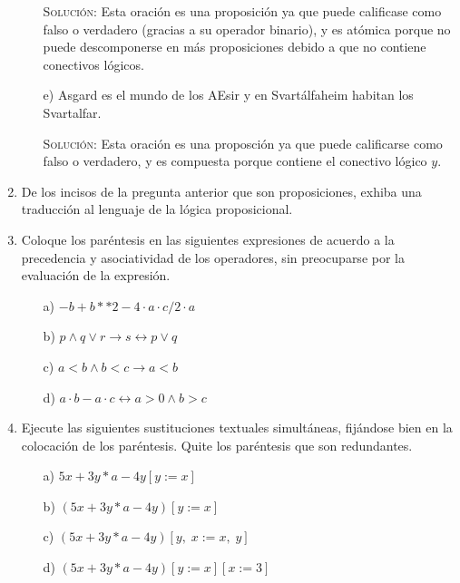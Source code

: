 \documentclass[letterpaper,11pt]{article}
\begin{document}
\begin{enumerate}
\begin{itemize}
        \textsc{Solución:} Esta oración es una proposición ya que puede 
        calificase como falso o verdadero (gracias a su operador binario), y es 
        atómica porque no puede descomponerse en más proposiciones debido a que 
        no contiene conectivos lógicos. 

        \item[e)] Asgard es el mundo de los AEsir y en Svartálfaheim habitan los 
        Svartalfar.

        \textsc{Solución:} Esta oración es una proposción ya que puede 
        calificarse como falso o verdadero, y es compuesta porque contiene el 
        conectivo lógico $y$. 

    \end{itemize}

    \item De los incisos de la pregunta anterior que son proposiciones, exhiba
    una traducción al lenguaje de la lógica proposicional.

    \item Coloque los paréntesis en las siguientes expresiones de acuerdo a la 
    precedencia y asociatividad de los operadores, sin preocuparse por la
    evaluación de la expresión.

    \begin{itemize}
        \item[a)] $-b + b * * 2 - 4 \cdot a \cdot c / 2 \cdot a$ 
        \item[b)] $p \land q \lor r → s ↔ p \lor q$
        \item[c)] $a < b \land b < c → a < b$
        \item[d)] $a \cdot b - a \cdot c ↔ a > 0 \land b > c$
    \end{itemize}

    \item Ejecute las siguientes sustituciones textuales simultáneas, fijándose
    bien en la colocación de los paréntesis. Quite los paréntesis que son 
    redundantes.

    \begin{itemize}
        \item[a)] $5x + 3y * a - 4y[y := x]$
        \item[b)] $(5x + 3y * a - 4y)[y := x]$
        \item[c)] $(5x + 3y * a - 4y)[y, \; x := x, \;y]$
        \item[d)] $(5x + 3y * a - 4y)[y := x][x := 3]$
    \end{itemize}


\end{enumerate}
\end{document}
